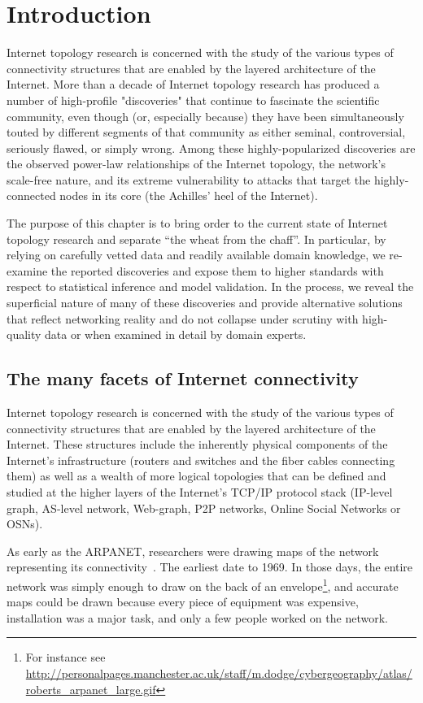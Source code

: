 \clearpage
\section{Introduction}

Internet topology research is concerned with the study of the various
types of connectivity structures that are enabled by the layered
architecture of the Internet. More than a decade of Internet topology
research has produced a number of high-profile "discoveries" that
continue to fascinate the scientific community, even though (or,
especially because) they have been simultaneously touted by different
segments of that community as either seminal, controversial, seriously
flawed, or simply wrong.  Among these highly-popularized discoveries
are the observed power-law relationships of the Internet topology, the
network's scale-free nature, and its extreme vulnerability to attacks
that target the highly-connected nodes in its core (\ie the
Achilles' heel of the Internet).

The purpose of this chapter is to bring order to the current state of
Internet topology research and separate ``the wheat from the chaff''.
In particular, by relying on carefully vetted data and readily
available domain knowledge, we re-examine the reported discoveries and
expose them to higher standards with respect to statistical inference
and model validation.  In the process, we reveal the superficial
nature of many of these discoveries and provide alternative solutions
that reflect networking reality and do not collapse under scrutiny
with high-quality data or when examined in detail by domain experts.

\subsection{The many facets of Internet connectivity}

Internet topology research is concerned with the study of the various
types of connectivity structures that are enabled by the layered
architecture of the Internet.  These structures include the inherently
physical components of the Internet's infrastructure (\eg routers
and switches and the fiber cables connecting them) as well as a wealth
of more logical topologies that can be defined and studied at the
higher layers of the Internet's TCP/IP protocol stack (\eg IP-level
graph, AS-level network, Web-graph, P2P networks, Online Social
Networks or OSNs).


As early as the ARPANET, researchers were drawing maps
of the network representing its
connectivity~\cite{cerf90:_selected_maps}.  The earliest date to
1969. In those days, the entire network was simply enough to draw on
the back of an envelope\footnote{For instance see
  \url{http://personalpages.manchester.ac.uk/staff/m.dodge/cybergeography/atlas/roberts_arpanet_large.gif}},
and accurate maps could be drawn because every piece of equipment was
expensive, installation was a major task, and only a few people worked
on the network.


